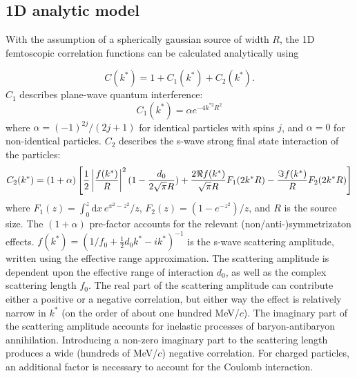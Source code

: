 \subsection{1D analytic model}
\label{sec:AnalyticModel}
With the assumption of a spherically gaussian source of width $R$, the 1D femtoscopic correlation functions can be calculated analytically \cite{lednicky82} using 

\begin{equation}
\label{eq:GeneralCorrelationFunction}
C(k^*)= 1 + C_1(k^*)+C_2(k^*).
\end{equation}
$C_1$ describes plane-wave quantum interference:
\begin{equation}
C_1(k^*) = \alpha e^{-4k^{*2}R^2}
\end{equation}
where $\alpha = (-1)^{2j}/(2j+1)$ for identical particles with spins $j$, and $\alpha = 0$ for non-identical particles.
$C_2$ describes the s-wave strong final state interaction of the particles:
\begin{equation}
\label{eq:Lednicky}
C_2(k^*)= (1+\alpha)\left[\frac{1}{2}\left\lvert\frac{f(k^*)}{R}\right\rvert^2(1-\frac{d_0}{2\sqrt{\pi}R})+\frac{2\Re f(k^*)}{\sqrt{\pi}R}F_1(2k^*R)-\frac{\Im f(k^*)}{R}F_2(2k^*R)\right]
\end{equation}
where $F_1(z) = \int_0^z \! \mathrm{d}x \, e^{x^2-z^2}/z$,  $F_2(z) = (1-e^{-z^2})/z$, and $R$ is the source size.
The $(1+\alpha)$ pre-factor accounts for the relevant (non/anti-)symmetrizaton effects.
$f(k^*)=(1/f_0+\frac{1}{2}d_0k^*-ik^*)^{-1}$ is the s-wave scattering amplitude, written using the effective range approximation.
The scattering amplitude is dependent upon the effective range of interaction $d_0$, as well as the complex scattering length $f_0$.  
The real part of the scattering amplitude can contribute either a positive or a negative correlation, but either way the effect is relatively narrow in $k^*$ (on the order of about one hundred MeV/$c$).  
The imaginary part of the scattering amplitude accounts for inelastic processes of baryon-antibaryon annihilation.  
Introducing a non-zero imaginary part to the scattering length produces a wide (hundreds of MeV/$c$) negative correlation.  
For charged particles, an additional factor \cite{Aamodt:2011kd} is necessary to account for the Coulomb interaction.

